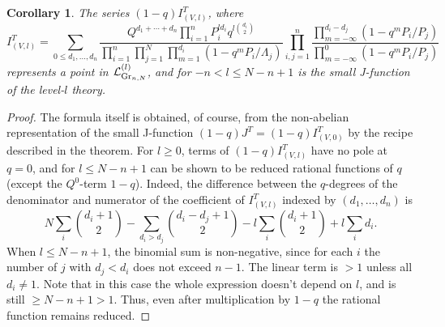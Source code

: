 \documentclass[pdftex]{sigma}
\numberwithin{equation}{section}
\newtheorem{Corollary}[Theorem]{Corollary}
\def\L{\mathcal L}
\begin{document}
\begin{Corollary}\label{cor5}
The series $(1-q) I^T_{(V,l)}$, where
\[
I^T_{(V,l)}=\sum_{0\leq d_1,\dots,d_n}\frac{Q^{d_1+\cdots+d_n}\prod_{i=1}^nP_i^{ld_i}q^{l\binom{d_i}{2}}} {\prod_{i=1}^n\prod_{j=1}^N\prod_{m=1}^{d_i}(1-q^mP_i/\Lambda_j)} \prod_{i,j=1}^n\frac{\prod_{m=-\infty}^{d_i-d_j}(1-q^mP_i/P_j)} {\prod_{m=-\infty}^0(1-q^mP_i/P_j)}
\]
represents a point in $\L_{{\rm Gr}_{n,N}}^{(l)}$, and for $-n<l\leq N-n+1$ is the small J-function of the level-$l$ theory.
\end{Corollary}
\begin{proof}
The formula itself is obtained, of course, from the non-abelian representation of the small J-function $(1-q)J^T=(1-q)I^T_{(V,0)}$ by the recipe described in the theorem. For $l\geq 0$, terms of $(1-q)I^T_{(V,l)}$ have no pole at $q=0$, and for $l\leq N-n+1$ can be shown to be reduced rational functions of $q$ (except the $Q^0$-term $1-q$). Indeed, the difference between the $q$-degrees of the denominator and numerator of the coefficient of $I^T_{(V,l)}$ indexed by $(d_1,\dots, d_n)$ is
\[
N\sum_i\binom{d_i+1}{2}-\sum_{d_i>d_j} \binom{d_i-d_j+1}{2}-l\sum_i\binom{d_i+1}{2}+l\sum_i d_i.
\]
When $l\leq N-n+1$, the binomial sum is non-negative, since for each $i$ the number of $j$ with $d_j<d_i$ does not exceed $n-1$. The linear term is $> 1$ unless all $d_i\neq 1$. Note that in this case the whole expression doesn't depend on $l$, and is still $\geq N-n+1>1$. Thus, even after multiplication by $1-q$ the rational function remains reduced.


\end{proof}
\end{document}
